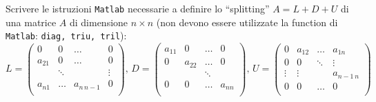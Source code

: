 Scrivere le istruzioni {\tt Matlab} necessarie a definire lo ``splitting'' $A=L+D+U$ di una matrice $A$ di dimensione $n \times n$ (non devono essere utilizzate la function di {\tt Matlab}: {\tt diag, triu, tril}):
\[ L=
\left( \begin{array}{cccc}
  0 &  0 & \dots & 0 \\
  a_{21}   & 0 & \ldots & 0 \\
&   \ddots&  & \vdots\\
  a_{n1} &  \dots & a_{n\,   n-1}& 0 \\
\end{array} \right), \, D=
\left( \begin{array}{cccc}
  a_{11} & 0 &\dots & 0 \\
  0 & a_{22} & \dots & 0 \\
& & \ddots& \\
  0 & 0&\dots & a_{nn} \\
\end{array} \right), \,
 U = \left( \begin{array}{cccc}
  0 & a_{12} &\dots &  a_{1n} \\
  0 &  0 &\ddots &   \vdots \\
  \vdots&    \vdots &   & a_{n-1\, n} \\
  0 & 0&\dots   &0\\
\end{array} \right)
\] 